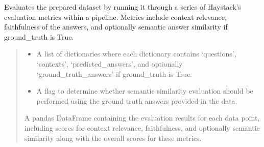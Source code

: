 \documentclass[letterpaper,10pt,english,openany,oneside]{sphinxmanual}
\begin{document}

\begin{fulllineitems}
\label{\detokenize{evaluation:tools.pipeline.haystack_evaluate_data}}
\pysigstartsignatures
{}
\pysigstopsignatures
\sphinxAtStartPar
Evaluates the prepared dataset by running it through a series of Haystack’s evaluation metrics within a
pipeline. Metrics include context relevance, faithfulness of the answers, and optionally
semantic answer similarity if ground\_truth is True.
\begin{quote}\begin{description}
\begin{itemize}
\item {} 
\sphinxAtStartPar
{} \textendash{} A list of dictionaries where each dictionary contains ‘questions’, ‘contexts’,
‘predicted\_answers’, and optionally ‘ground\_truth\_answers’ if ground\_truth is True.

\item {} 
\sphinxAtStartPar
{} \textendash{} A flag to determine whether semantic similarity evaluation should be
performed using the ground truth answers provided in the data.

\end{itemize}

\sphinxAtStartPar
A pandas DataFrame containing the evaluation results for each data point, including scores
for context relevance, faithfulness, and optionally semantic similarity along with the overall
scores for these metrics.

\end{description}\end{quote}

\end{fulllineitems}
\end{document}
